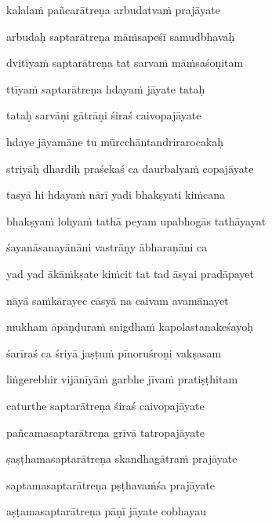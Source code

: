 kalala\.m pañcarātreṇa arbudatva\.m prajāyate \veg\dontdisplaylinenum

arbudaḥ saptarātreṇa mā\.msapeśī samudbhavaḥ\thinspace{\dandab} \dontdisplaylinenum

dvitīya\.m saptarātreṇa tat sarva\.m mā\.msaśoṇitam \veg\dontdisplaylinenum

ttīya\.m saptarātreṇa hdaya\.m jāyate tataḥ\thinspace{\dandab} \dontdisplaylinenum

tataḥ sarvāṇi gātrāṇi śiraś caivopajāyate \veg\dontdisplaylinenum

hdaye jāyamāne tu mūrcchāntandrirarocakaḥ\thinspace{\dandab} \dontdisplaylinenum

striyāḥ dhardiḥ praśekaś ca daurbalya\.m copajāyate \veg\dontdisplaylinenum

tasyā hi hdaya\.m nārī yadi bhakṣyati ki\.mcana\thinspace{\dandab} \dontdisplaylinenum

bhakṣya\.m lohya\.m tathā peyam upabhogās tathāyayat \veg\dontdisplaylinenum

śayanāsanayānāni vastrāṇy ābharaṇāni ca\thinspace{\dandab} \dontdisplaylinenum

yad yad ākā\.mkṣate ki\.mcit tat tad āsyai pradāpayet \veg\dontdisplaylinenum

nāyā sa\.mkārayec cāsyā na caivam avamānayet\thinspace{\dandab} \dontdisplaylinenum

mukham āpāṇḍura\.m snigdha\.m kapolastanakeśayoḥ \veg\dontdisplaylinenum

śarīraś ca śriyā jaṣṭu\.m pīnoruśroṇi vakṣasam\thinspace{\dandab} \dontdisplaylinenum

liṅgerebhir vijānīyā\.m garbhe jīva\.m pratiṣṭhitam \veg\dontdisplaylinenum

caturthe saptarātreṇa śiraś caivopajāyate\thinspace{\dandab} \dontdisplaylinenum

pañcamasaptarātreṇa grīvā tatropajāyate \veg\dontdisplaylinenum

ṣaṣṭhamasaptarātreṇa skandhagātra\.m prajāyate\thinspace{\dandab} \dontdisplaylinenum

saptamasaptarātreṇa pṣṭhava\.mśa prajāyate \veg\dontdisplaylinenum

aṣṭamasaptarātreṇa pāṇī jāyate cobhayau\thinspace{\dandab} \dontdisplaylinenum

